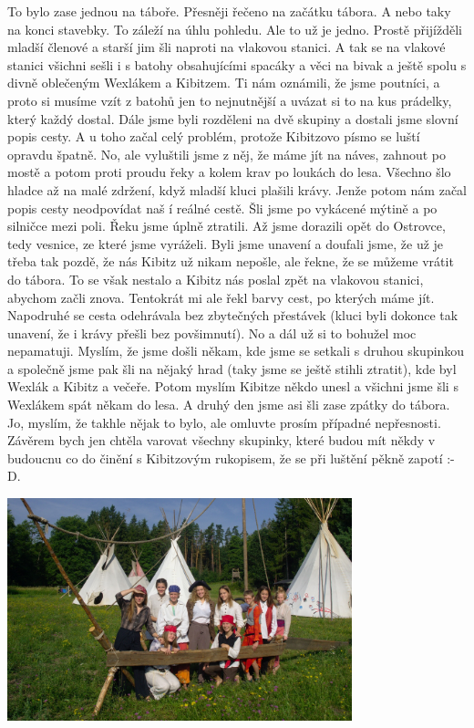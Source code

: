 \begin{multicols}{2}
To bylo zase jednou na táboře. Přesněji řečeno na začátku tábora. A nebo taky na konci stavebky. To záleží na úhlu pohledu. Ale to už je jedno. Prostě přijížděli mladší členové a starší jim šli naproti na vlakovou stanici. A tak se na vlakové stanici všichni sešli i s batohy obsahujícími spacáky a věci na bivak a ještě spolu s divně oblečeným Wexlákem a Kibitzem. Ti nám oznámili, že jsme poutníci, a proto si musíme vzít z batohů jen to nejnutnější a uvázat si to na kus prádelky, který každý dostal. Dále jsme byli rozděleni na dvě skupiny a dostali jsme slovní popis cesty. A u toho začal celý problém, protože Kibitzovo písmo se luští opravdu špatně. No, ale vyluštili jsme z něj, že máme jít na náves, zahnout po mostě a potom proti proudu řeky a kolem krav po loukách do lesa. Všechno šlo hladce až na malé zdržení, když mladší kluci plašili krávy. Jenže potom nám začal popis cesty neodpovídat naš
í reálné cestě. Šli jsme po vykácené mýtině a po silničce mezi poli. Řeku jsme úplně ztratili. Až jsme dorazili opět do Ostrovce, tedy vesnice, ze které jsme vyráželi. Byli jsme unavení a doufali jsme, že už je třeba tak pozdě, že nás Kibitz už nikam nepošle, ale řekne, že se můžeme vrátit do tábora. To se však nestalo a Kibitz nás poslal zpět na vlakovou stanici, abychom začli znova. Tentokrát mi ale řekl barvy cest, po kterých máme jít. Napodruhé se cesta odehrávala bez zbytečných přestávek (kluci byli dokonce tak unavení, že i krávy přešli bez povšimnutí). No a dál už si to bohužel moc nepamatuji. Myslím, že jsme došli někam, kde jsme se setkali s druhou skupinkou a společně jsme pak šli na nějaký hrad (taky jsme se ještě stihli ztratit), kde byl Wexlák a Kibitz a večeře. Potom myslím Kibitze někdo unesl a všichni jsme šli s Wexlákem spát někam do lesa. A druhý den jsme asi šli zase zpátky do tábora. Jo, myslím, že takhle nějak to bylo, ale omluvte prosím případné nepřesnosti. Závěrem bych jen chtěla varovat všechny skupinky, které budou mít někdy v budoucnu co do činění s Kibitzovým rukopisem, že se při luštění pěkně zapotí :-D.



\end{multicols}

\begin{center}

\includegraphics[width=10cm]{img/druziny/jesterky.jpg}

\end{center}


